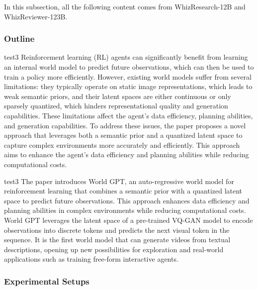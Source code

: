{\color{warningcolor} In this subsection, all the following content comes from WhizResearch-12B and WhizReviewer-123B.}
\subsubsection{Outline}
\begin{example}{}{test3}
Reinforcement learning (RL) agents can significantly benefit from learning an internal world model to predict future observations, which can then be used to train a policy more efficiently. However, existing world models suffer from several limitations: they typically operate on static image representations, which leads to weak semantic priors, and their latent spaces are either continuous or only sparsely quantized, which hinders representational quality and generation capabilities. These limitations affect the agent's data efficiency, planning abilities, and generation capabilities. To address these issues, the paper proposes a novel approach that leverages both a semantic prior and a quantized latent space to capture complex environments more accurately and efficiently. This approach aims to enhance the agent's data efficiency and planning abilities while reducing computational costs.

\end{example}
\begin{note}{}{test3}
The paper introduces World GPT, an auto-regressive world model for reinforcement learning that combines a semantic prior with a quantized latent space to predict future observations. This approach enhances data efficiency and planning abilities in complex environments while reducing computational costs. World GPT leverages the latent space of a pre-trained VQ-GAN model to encode observations into discrete tokens and predicts the next visual token in the sequence. It is the first world model that can generate videos from textual descriptions, opening up new possibilities for exploration and real-world applications such as training free-form interactive agents.

\end{note}

\subsubsection{Experimental Setups}


